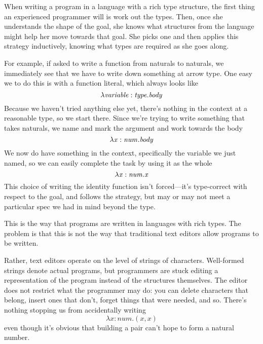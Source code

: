 


When writing a program in a language with a rich type structure, the first
thing an experienced programmer will is work out the types. Then, once she
understands the shape of the goal, she knows what structures from the
language might help her move towards that goal. She picks one and then
applies this strategy inductively, knowing what types are required as she
goes along.

For example, if asked to write a function from naturals to naturals, we
immediately see that we have to write down something at arrow type. One
easy we to do this is with a function literal, which always looks
like $$\lambda \mathit{variable:type}.\mathit{body}$$ Because we haven't
tried anything else yet, there's nothing in the context at a reasonable
type, so we start there. Since we're trying to write something that takes
naturals, we name and mark the argument and work towards the
body $$\lambda \mathit{x:num}.\mathit{body}$$ We now do have something in
the context, specifically the variable we just named, so we can easily
complete the task by using it as the whole
$$\lambda \mathit{x:num}.\mathit{x}$$ This choice of writing the identity
function isn't forced---it's type-correct with respect to the goal, and
follows the strategy, but may or may not meet a particular spec we had in
mind beyond the type.

This is the way that programs are written in languages with rich types. The
problem is that this is not the way that traditional text editors allow
programs to be written.

Rather, text editors operate on the level of strings of
characters. Well-formed strings denote actual programs, but programmers are
stuck editing a representation of the program instead of the structures
themselves. The editor does not restrict what the programmer may do: you
can delete characters that belong, insert ones that don't, forget things
that were needed, and so. There's nothing stopping us from accidentally
writing $$\lambda \mathit{x:num}.\mathit{(x,x)}$$ even though it's obvious
that building a pair can't hope to form a natural number.

